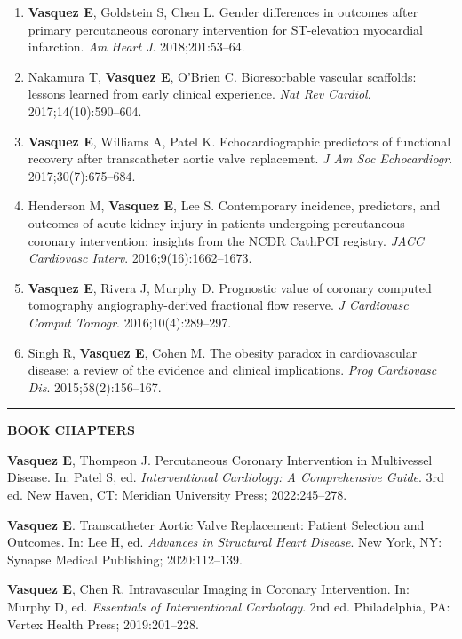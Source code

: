 \documentclass[11pt,a4paper]{article}
\newcommand{\cvsection}[1]{%
  \vspace{1.2em}%
  \noindent
  {\color{primary}\rule{3.5pt}{15pt}}\hspace{8pt}%
  {\color{primary}\Large\bfseries\MakeUppercase{#1}}%
  \vspace{0.2em}%
  \par\noindent{\color{primary!25}\rule{\textwidth}{0.5pt}}%
  \vspace{0.6em}%
}
\begin{document}
{\color{darktext}
\begin{enumerate}[leftmargin=*, itemsep=2pt, topsep=0pt, start=11]

\item \textbf{Vasquez E}, Goldstein S, Chen L. Gender differences in outcomes after primary percutaneous coronary intervention for ST-elevation myocardial infarction. \textit{Am Heart J}. 2018;201:53--64.

\item Nakamura T, \textbf{Vasquez E}, O'Brien C. Bioresorbable vascular scaffolds: lessons learned from early clinical experience. \textit{Nat Rev Cardiol}. 2017;14(10):590--604.

\item \textbf{Vasquez E}, Williams A, Patel K. Echocardiographic predictors of functional recovery after transcatheter aortic valve replacement. \textit{J Am Soc Echocardiogr}. 2017;30(7):675--684.

\item Henderson M, \textbf{Vasquez E}, Lee S. Contemporary incidence, predictors, and outcomes of acute kidney injury in patients undergoing percutaneous coronary intervention: insights from the NCDR CathPCI registry. \textit{JACC Cardiovasc Interv}. 2016;9(16):1662--1673.

\item \textbf{Vasquez E}, Rivera J, Murphy D. Prognostic value of coronary computed tomography angiography-derived fractional flow reserve. \textit{J Cardiovasc Comput Tomogr}. 2016;10(4):289--297.

\item Singh R, \textbf{Vasquez E}, Cohen M. The obesity paradox in cardiovascular disease: a review of the evidence and clinical implications. \textit{Prog Cardiovasc Dis}. 2015;58(2):156--167.

\end{enumerate}
}

\cvsection{Book Chapters}

\vspace{-2pt}
{\color{darktext}
\noindent\textbf{\color{primary}Vasquez E}, Thompson J. Percutaneous Coronary Intervention in Multivessel Disease. In: Patel S, ed. \textit{Interventional Cardiology: A Comprehensive Guide}. 3rd ed. New Haven, CT: Meridian University Press; 2022:245--278.

\vspace{4pt}
\noindent\textbf{\color{primary}Vasquez E}. Transcatheter Aortic Valve Replacement: Patient Selection and Outcomes. In: Lee H, ed. \textit{Advances in Structural Heart Disease}. New York, NY: Synapse Medical Publishing; 2020:112--139.

\vspace{4pt}
\noindent\textbf{\color{primary}Vasquez E}, Chen R. Intravascular Imaging in Coronary Intervention. In: Murphy D, ed. \textit{Essentials of Interventional Cardiology}. 2nd ed. Philadelphia, PA: Vertex Health Press; 2019:201--228.
}
\end{document}
